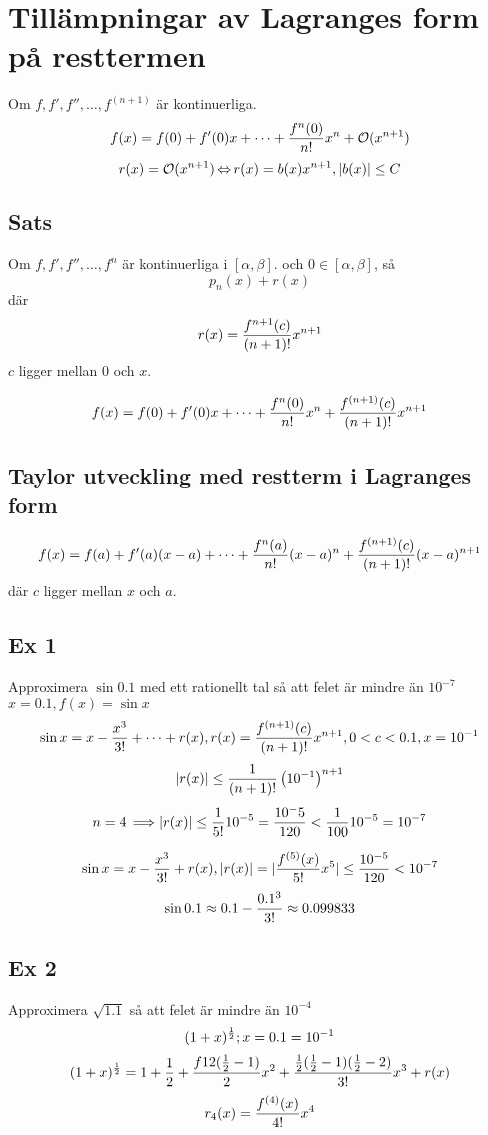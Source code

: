 \documentclass{article}
\newcommand{\Or}{{\mathcal{O}}}
\begin{document}
\section{Tillämpningar av Lagranges form på resttermen}
Om $f, f', f'', \dots, f^{(n+1)}$ är kontinuerliga.
$$ f(x) = f(0) + f'(0)x + \dots + \f{f^n(0)}{n!}x^n + \Or(x^{n+1}) $$
$$ r(x) = \Or(x^{n+1}) \eq r(x) = b(x)x^{n+1}, \abs{b(x)} \le C $$

\subsection{Sats}
Om $f, f', f'', \dots, f^n$ är kontinuerliga i $[\alpha, \beta]$.
och $0 \in [\alpha, \beta]$, så
$$ p_n(x) + r(x) $$
där
$$ r(x) = \frac{f^{n+1}(c)}{(n+1)!}x^{n+1} $$
$c$ ligger mellan $0$ och $x$.

$$ f(x) = f(0) + f'(0)x + \dots + \frac{f^n(0)}{n!}x^n + \frac{f^{(n+1)}(c)}{(n+1)!}x^{n+1} $$

\subsection{Taylor utveckling med restterm i Lagranges form}
$$ f(x) = f(a) + f'(a)(x-a) + \dots + \frac{f^n(a)}{n!}(x-a)^n + \frac{f^{(n+1)}(c)}{(n+1)!}(x-a)^{n+1} $$
där $c$ ligger mellan $x$ och $a$.

\subsection{Ex 1}
Approximera $\sin 0.1$ med ett rationellt tal så att felet är mindre än $10^{-7}$
$x=0.1, f(x) = \sin x$
$$ \sin x = x - \frac{x^3}{3!} + \dots + r(x), r(x) = \frac{f^{(n+1)}(c)}{(n+1)!}x^{n+1}, 0<c<0.1, x=10^{-1} $$
$$ \lvert r(x)\rvert \le \frac{1}{(n+1)!}\left(10^{-1}\right)^{n+1} $$
$$ n=4\operatorname{\implies}\lvert r(x)\rvert\le\frac{1}{5!}10^{-5}=\frac{10^-5}{120}<\frac{1}{100} 10^{-5} = 10^{-7} $$

$$ \sin x = x - \frac{x^3}{3!} + r(x), \lvert r(x)\rvert =\lvert\frac{f^{(5)}(x)}{5!}x^5\rvert \le \frac{10^{-5}}{120} < 10^{-7}$$
$$ \sin 0.1 \approx 0.1 - \frac{0.1^3}{3!} \approx 0.099833 $$

\subsection{Ex 2}
Approximera $\sqrt{1.1}$ så att felet är mindre än $10^{-4}$
$$ (1+x)^{\frac{1}{2}}; x=0.1=10^{-1}  $$
$$ (1+x)^{\frac{1}{2}} = 1+\frac{1}{2} + \frac{f 12(\frac{1}{2} -1)}{2} x^2 + \frac{\frac{1}{2}(\frac{1}{2} - 1)(\frac{1}{2} -2 )}{3!}x^3 + r(x) $$
$$ r_4(x) = \frac{f^{(4)}(x)}{4!}x^4 $$
\end{document}
